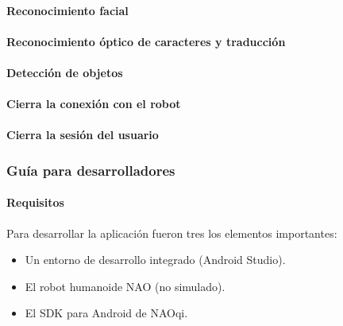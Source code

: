 \paragraph{Reconocimiento facial}
\label{\detokenize{users_docs:reconocimiento-facial}}

\paragraph{Reconocimiento óptico de caracteres y traducción}
\label{\detokenize{users_docs:reconocimiento-optico-de-caracteres-y-traduccion}}

\paragraph{Detección de objetos}
\label{\detokenize{users_docs:deteccion-de-objetos}}

\paragraph{Cierra la conexión con el robot}
\label{\detokenize{users_docs:cierra-la-conexion-con-el-robot}}

\paragraph{Cierra la sesión del usuario}
\label{\detokenize{users_docs:cierra-la-sesion-del-usuario}}

\subsubsection{Guía para desarrolladores}
\label{\detokenize{dev_docs::doc}}\label{\detokenize{dev_docs:guia-para-desarrolladores}}

\paragraph{Requisitos}
\label{\detokenize{dev_docs:requisitos}}
Para desarrollar la aplicación fueron tres los elementos importantes:
\begin{itemize}
\item {} 
Un entorno de desarrollo integrado (Android Studio).

\item {} 
El robot humanoide NAO (no simulado).

\item {} 
El SDK para Android de NAOqi.

\end{itemize}

